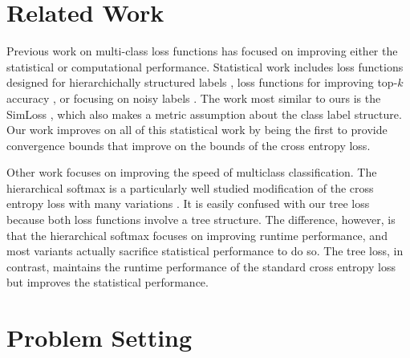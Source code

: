 \documentclass[twoside]{article}
\begin{document}

\section{Related Work}
\label{sec:related}

Previous work on multi-class loss functions has focused on improving either the statistical or computational performance.
Statistical work includes loss functions designed for hierarchichally structured labels \citep{cesa2006incremental,wu2017hierarchical,bertinetto2020making},
loss functions for improving top-$k$ accuracy \citep{lapin2016loss},
or focusing on noisy labels \citep{sukhbaatar2014training,zhang2018generalized}.
The work most similar to ours is the SimLoss \citep{Kobs2020SimLossCS},
which also makes a metric assumption about the class label structure.
Our work improves on all of this statistical work by being the first to provide convergence bounds that improve on the bounds of the cross entropy loss.


Other work focuses on improving the speed of multiclass classification.
The hierarchical softmax \citep{morin2005hierarchical} is a particularly well studied modification of the cross entropy loss with many variations \citep[e.g.][]{Peng2017IncrementallyLT,Jiang2017ExplorationOT,Yang2017OptimizeHS,Mohammed2018EffectivenessOH}.
It is easily confused with our tree loss because both loss functions involve a tree structure.
The difference, however, is that the hierarchical softmax focuses on improving runtime performance,
and most variants actually sacrifice statistical performance to do so.
The tree loss, in contrast, maintains the runtime performance of the standard cross entropy loss but improves the statistical performance.



\section{Problem Setting}
\label{sec:problem}
\end{document}
